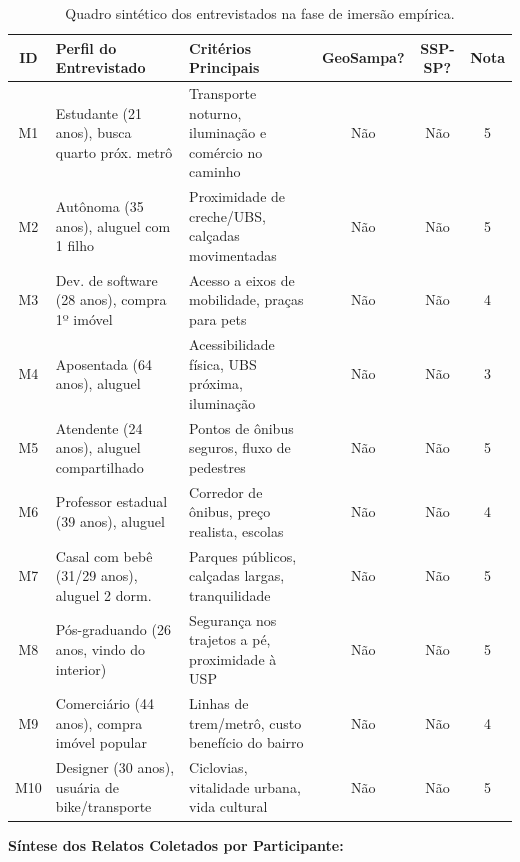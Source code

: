 \begin{table}[!htbp]
\centering
\small
\renewcommand{\arraystretch}{1.25}
\begin{tabular}{|c|p{3.2cm}|p{4.2cm}|c|c|c|}
\hline
\textbf{ID} & \textbf{Perfil do Entrevistado} & \textbf{Critérios Principais} & \textbf{GeoSampa?} & \textbf{SSP-SP?} & \textbf{Nota} \\
\hline
M1 & Estudante (21 anos), busca quarto próx. metrô & Transporte noturno, iluminação e comércio no caminho & Não & Não & 5 \\
\hline
M2 & Autônoma (35 anos), aluguel com 1 filho & Proximidade de creche/UBS, calçadas movimentadas & Não & Não & 5 \\
\hline
M3 & Dev. de software (28 anos), compra 1º imóvel & Acesso a eixos de mobilidade, praças para pets & Não & Não & 4 \\
\hline
M4 & Aposentada (64 anos), aluguel & Acessibilidade física, UBS próxima, iluminação & Não & Não & 3 \\
\hline
M5 & Atendente (24 anos), aluguel compartilhado & Pontos de ônibus seguros, fluxo de pedestres & Não & Não & 5 \\
\hline
M6 & Professor estadual (39 anos), aluguel & Corredor de ônibus, preço realista, escolas & Não & Não & 4 \\
\hline
M7 & Casal com bebê (31/29 anos), aluguel 2 dorm. & Parques públicos, calçadas largas, tranquilidade & Não & Não & 5 \\
\hline
M8 & Pós-graduando (26 anos, vindo do interior) & Segurança nos trajetos a pé, proximidade à USP & Não & Não & 5 \\
\hline
M9 & Comerciário (44 anos), compra imóvel popular & Linhas de trem/metrô, custo benefício do bairro & Não & Não & 4 \\
\hline
M10 & Designer (30 anos), usuária de bike/transporte & Ciclovias, vitalidade urbana, vida cultural & Não & Não & 5 \\
\hline
\end{tabular}
\caption{Quadro sintético dos entrevistados na fase de imersão empírica.}
\label{tab:resumo_entrevistados}
\end{table}

\vspace{0.5em}

\noindent\textbf{Síntese dos Relatos Coletados por Participante:}

